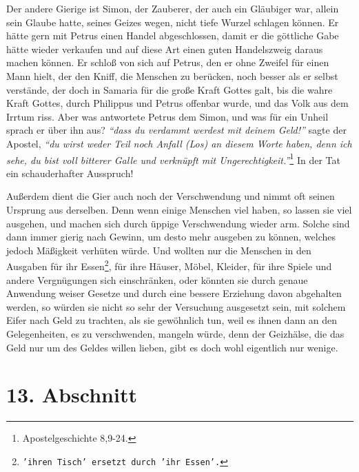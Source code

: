 Der andere Gierige ist Simon, der Zauberer, der auch ein
Gläubiger war, allein
sein Glaube hatte, seines Geizes wegen, nicht tiefe Wurzel schlagen können. Er
hätte gern mit Petrus einen Handel abgeschlossen, damit
er die göttliche Gabe
hätte wieder verkaufen und auf diese Art einen guten Handelszweig daraus machen
können. Er schloß von sich auf Petrus, den er ohne Zweifel für einen Mann hielt,
der den Kniff, die Menschen zu berücken, noch besser als er selbst verstände,
der doch in Samaria für die große Kraft Gottes galt, bis
die wahre Kraft Gottes,
durch Philippus und Petrus offenbar wurde, und das
Volk aus dem Irrtum riss.
Aber was antwortete Petrus dem Simon, und was für ein Unheil sprach er über ihn
aus? \textit{"`dass du verdammt werdest mit deinem Geld!"'} sagte der Apostel,
\textit{"`du wirst
weder Teil noch Anfall (Los) an diesem Worte haben, denn ich sehe, du bist
voll bitterer Galle und verknüpft mit Ungerechtigkeit."'}\footnote{Apostelgeschichte 8,9-24.}
In der Tat ein schauderhafter Ausspruch!

\medskip

Außerdem dient die Gier auch noch der Verschwendung und
nimmt oft seinen
Ursprung aus derselben. Denn wenn einige Menschen viel haben, so lassen sie viel
ausgehen, und machen sich durch üppige Verschwendung wieder arm. Solche sind
dann immer gierig nach Gewinn, um desto mehr ausgeben zu können, welches jedoch
Mäßigkeit verhüten würde. Und wollten nur die Menschen in den Ausgaben für ihr
Essen\footnote{\texttt{'ihren Tisch' ersetzt durch 'ihr Essen'.}}, für ihre
Häuser, Möbel, Kleider, für ihre
Spiele und andere Vergnügungen
sich einschränken, oder könnten sie durch genaue Anwendung weiser Gesetze und
durch eine bessere Erziehung davon abgehalten werden, so würden
sie nicht so
sehr der Versuchung ausgesetzt sein, mit solchem Eifer nach
Geld zu trachten,
als sie gewöhnlich tun, weil es ihnen dann an den
Gelegenheiten, es zu
verschwenden, mangeln würde, denn der Geizhälse, die das Geld nur um des Geldes
willen lieben, gibt es doch wohl eigentlich nur wenige.

\section{13. Abschnitt} \label{kap13_ab13}

